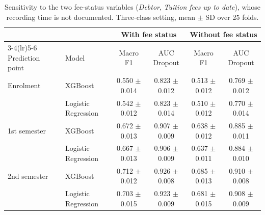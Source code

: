 \begin{table}[H]
\centering
\small
\setlength{\tabcolsep}{4pt}
\caption{Sensitivity to the two fee-status variables (\emph{Debtor}, \emph{Tuition fees up to date}), whose recording time is not documented. Three-class setting, mean $\pm$ SD over 25 folds.}
\label{tab:sensitivity}
\begin{tabular}{llcccc}
\toprule
 & & \multicolumn{2}{c}{With fee status} & \multicolumn{2}{c}{Without fee status} \\
\cmidrule(lr){3-4}\cmidrule(lr){5-6}
Prediction point & Model & Macro F1 & AUC Dropout & Macro F1 & AUC Dropout \\
\midrule
Enrolment & XGBoost & 0.550 $\pm$ 0.014 & 0.823 $\pm$ 0.012 & 0.513 $\pm$ 0.012 & 0.769 $\pm$ 0.012 \\
 & Logistic Regression & 0.542 $\pm$ 0.012 & 0.823 $\pm$ 0.014 & 0.510 $\pm$ 0.012 & 0.770 $\pm$ 0.014 \\
1st semester & XGBoost & 0.672 $\pm$ 0.013 & 0.907 $\pm$ 0.009 & 0.638 $\pm$ 0.012 & 0.885 $\pm$ 0.011 \\
 & Logistic Regression & 0.667 $\pm$ 0.013 & 0.906 $\pm$ 0.009 & 0.637 $\pm$ 0.011 & 0.884 $\pm$ 0.010 \\
2nd semester & XGBoost & 0.712 $\pm$ 0.012 & 0.926 $\pm$ 0.008 & 0.685 $\pm$ 0.013 & 0.910 $\pm$ 0.008 \\
 & Logistic Regression & 0.703 $\pm$ 0.015 & 0.923 $\pm$ 0.009 & 0.681 $\pm$ 0.015 & 0.908 $\pm$ 0.009 \\
\bottomrule
\end{tabular}
\end{table}
